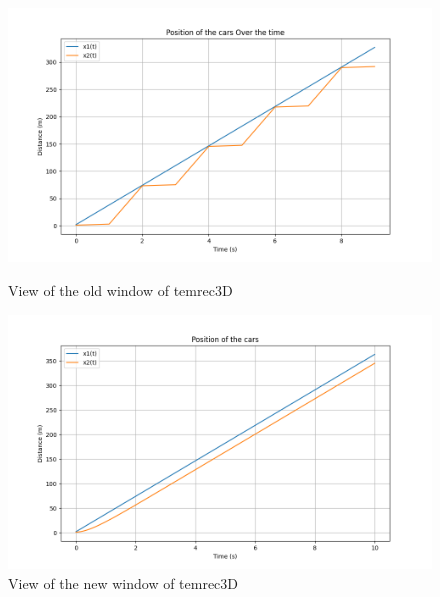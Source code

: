 \documentclass{article}
\begin{document}
		\begin{figure}[H]
			\centering
			\begin{minipage}[t]{0.50\linewidth}
				\centering
				\includegraphics[width=1.4\linewidth]{RealisticCase.png}
				\caption{View of the old window of temrec3D}
				\label{fig:OV}
			\end{minipage}
			\hfill
			\begin{minipage}[t]{0.50\linewidth}
				\centering
				\includegraphics[width=1.4\linewidth]{RealSolCase.png}
				\caption{View of the new window of temrec3D}
				\label{fig:NV}
			\end{minipage}
		\end{figure}
		
\end{document}
